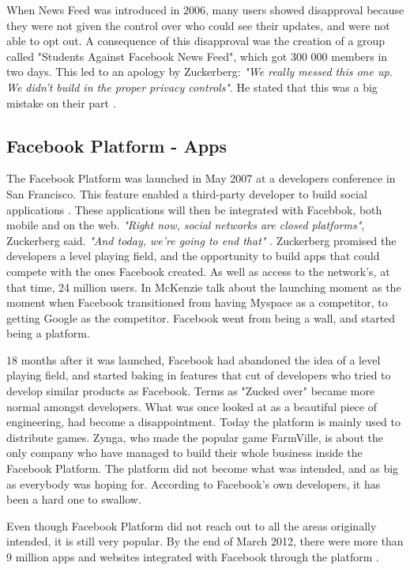 When News Feed was introduced in 2006, many users showed disapproval because they were not given the control over who could see their updates, and were not able to opt out. A consequence of this disapproval was the creation of a group called "Students Against Facebook News Feed", which got 300 000 members in two days. This led to an apology by Zuckerberg: \textit{"We really messed this one up. We didn't build in the proper privacy controls"}. He stated that this was a big mistake on their part \cite{newsfeed2}. 


\subsection{Facebook Platform - Apps}
\label{subsec:app}
The Facebook Platform was launched in May 2007 at a developers conference in San Francisco. This feature enabled a third-party developer to build social applications \cite{BBCFacebookGrowth}. These applications will then be integrated with Facebbok, both mobile and on the web. \textit{"Right now, social networks are closed platforms"}, Zuckerberg said. \textit{"And today, we're going to end that"} \cite{platformStory}. Zuckerberg promised the developers a level playing field, and the opportunity to build apps that could compete with the ones Facebook created. As well as access to the network's, at that time, 24 million users. In \cite{platformStory} McKenzie talk about the launching moment as the moment when Facebook transitioned from having Myspace as a competitor, to getting Google as the competitor. Facebook went from being a wall, and started being a platform. 

18 months after it was launched, Facebook had abandoned the idea of a level playing field, and started baking in features that cut of developers who tried to develop similar products as Facebook. Terms as "Zucked over" became more normal amongst developers. What was once looked at as a beautiful piece of engineering, had become a disappointment. Today the platform is mainly used to distribute games. Zynga, who made the popular game FarmVille, is about the only company who have managed to build their whole business inside the Facebook Platform. The platform did not become what was intended, and as big as everybody was hoping for. According to Facebook's own developers, it has been a hard one to swallow. 

Even though Facebook Platform did not reach out to all the areas originally intended, it is still very popular. By the end of March 2012, there were more than 9 million apps and websites integrated with Facebook through the platform \cite{fbPlatform}.

